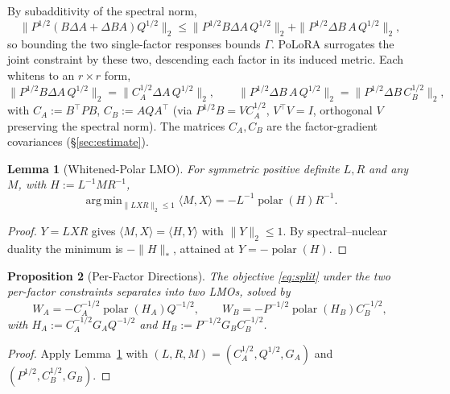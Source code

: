 \documentclass[11pt]{article}
\DeclarePairedDelimiter{\norm}{\lVert}{\rVert}
\newcommand{\polar}{\operatorname{polar}}
\DeclareMathOperator*{\argmin}{arg\,min}
\newcommand{\norm}[1]{\| #1\|}
\newtheorem{proposition}{Proposition}
\newtheorem{lemma}[proposition]{Lemma}
\begin{document}
By subadditivity of the spectral norm,
\begin{equation}
  \norm{P^{1/2}(B\Delta A+\Delta B A)Q^{1/2}}_2
  \le\norm{P^{1/2}B\Delta A\,Q^{1/2}}_2+\norm{P^{1/2}\Delta B\,A\,Q^{1/2}}_2,
  \label{eq:subadd}
\end{equation}
so bounding the two single-factor responses bounds $\Gamma$. PoLoRA surrogates the
joint constraint by these two, descending each factor in its induced metric. Each
whitens to an $r\times r$ form,
\begin{equation}
  \norm{P^{1/2}B\Delta A\,Q^{1/2}}_2=\norm{C_A^{1/2}\Delta A\,Q^{1/2}}_2,
  \qquad
  \norm{P^{1/2}\Delta B\,A\,Q^{1/2}}_2=\norm{P^{1/2}\Delta B\,C_B^{1/2}}_2,
  \label{eq:whiten}
\end{equation}
with $C_A:=B^\top PB$, $C_B:=AQA^\top$ (via $P^{1/2}B=VC_A^{1/2}$, $V^\top V=I$,
orthogonal $V$ preserving the spectral norm). The matrices $C_A,C_B$ are the
factor-gradient covariances (\S\ref{sec:estimate}).

\begin{lemma}[Whitened-Polar LMO]
\label{lem:lmo}
For symmetric positive definite $L,R$ and any $M$, with $H:=L^{-1}MR^{-1}$,
\begin{equation}
  \argmin_{\norm{LXR}_2\le1}\langle M,X\rangle=-L^{-1}\polar(H)R^{-1}.
  \label{eq:lmo}
\end{equation}
\end{lemma}

\begin{proof}
$Y=LXR$ gives $\langle M,X\rangle=\langle H,Y\rangle$ with $\norm{Y}_2\le1$. By
spectral--nuclear duality the minimum is $-\norm{H}_*$, attained at $Y=-\polar(H)$.
\end{proof}

\begin{proposition}[Per-Factor Directions]
\label{prop:dirs}
The objective \eqref{eq:split} under the two per-factor constraints separates
into two LMOs, solved by
\begin{equation}
  W_A=-C_A^{-1/2}\polar(H_A)Q^{-1/2},
  \qquad
  W_B=-P^{-1/2}\polar(H_B)C_B^{-1/2},
  \label{eq:WAWB}
\end{equation}
with $H_A:=C_A^{-1/2}G_AQ^{-1/2}$ and $H_B:=P^{-1/2}G_BC_B^{-1/2}$.
\end{proposition}

\begin{proof}
Apply Lemma~\ref{lem:lmo} with $(L,R,M)=(C_A^{1/2},Q^{1/2},G_A)$ and
$(P^{1/2},C_B^{1/2},G_B)$.
\end{proof}
\end{document}
